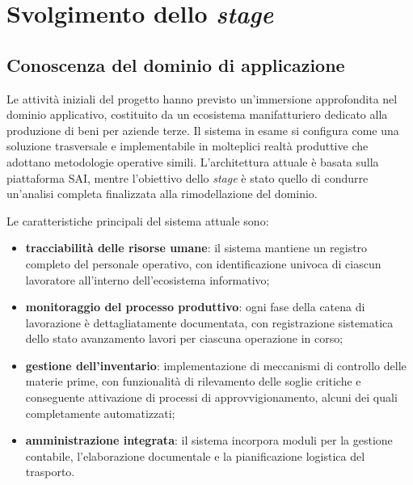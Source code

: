 \chapter{Svolgimento dello \textit{stage}}
    \section{Conoscenza del dominio di applicazione}
    Le attività iniziali del progetto hanno previsto un'immersione approfondita nel dominio applicativo, costituito da un ecosistema manifatturiero dedicato alla produzione di beni per aziende terze. Il sistema in esame si configura come una soluzione trasversale e implementabile in molteplici realtà produttive che adottano metodologie operative simili. L'architettura attuale è basata sulla piattaforma SAI, mentre l'obiettivo dello \textit{stage} è stato quello di condurre un'analisi completa finalizzata alla rimodellazione del dominio.

    \vspace{0.2 em}
    \noindent Le caratteristiche principali del sistema attuale sono:

    \begin{itemize}
        \item \textbf{tracciabilità delle risorse umane}: il sistema mantiene un registro completo del personale operativo, con identificazione univoca di ciascun lavoratore all'interno dell'ecosistema informativo;

        \item \textbf{monitoraggio del processo produttivo}: ogni fase della catena di lavorazione è dettagliatamente documentata, con registrazione sistematica dello stato avanzamento lavori per ciascuna operazione in corso;

        \item \textbf{gestione dell'inventario}: implementazione di meccanismi di controllo delle materie prime, con funzionalità di rilevamento delle soglie critiche e conseguente attivazione di processi di approvvigionamento, alcuni dei quali completamente automatizzati;

        \item \textbf{amministrazione integrata}: il sistema incorpora moduli per la gestione contabile, l'elaborazione documentale e la pianificazione logistica del trasporto.

    \end{itemize}
    
